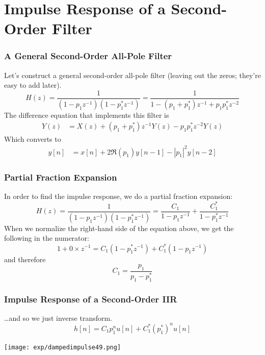 \documentclass{beamer}
\begin{document}
\section[Second-Order]{Impulse Response of a Second-Order Filter}
\setcounter{subsection}{1}

\begin{frame}
  \frametitle{A General Second-Order All-Pole Filter}

  Let's construct a general second-order all-pole filter (leaving out
  the zeros; they're easy to add later).
  \[
  H(z) = \frac{1}{(1-p_1z^{-1})(1-p_1^*z^{-1})}= \frac{1}{1-(p_1+p_1^*)z^{-1}+p_1p_1^*z^{-2}}
  \]
  The difference equation that implements this filter is
  \begin{align*}
    Y(z) &= X(z) + (p_1+p_1^*)z^{-1}Y(z) -p_1p_1^*z^{-2}Y(z)
  \end{align*}
  Which converts to
  \begin{align*}
    y[n] &= x[n] + 2\Re(p_1)y[n-1] - |p_1|^2 y[n-2]
  \end{align*}
\end{frame}

\begin{frame}
  \frametitle{Partial Fraction Expansion}

  In order to find the impulse response, we do a partial fraction expansion:
  \[
  H(z) = \frac{1}{(1-p_1z^{-1})(1-p_1^*z^{-1})}= \frac{C_1}{1-p_1z^{-1}} + \frac{C_1^*}{1-p_1^*z^{-1}}
  \]
  When we normalize the right-hand side of the equation above, we get the following
  in the numerator:
  \begin{displaymath}
    1 + 0\times z^{-1} = C_1(1-p_1^*z^{-1}) + C_1^*(1-p_1z^{-1})
  \end{displaymath}
  and therefore
  \begin{displaymath}
    C_1 = \frac{p_1}{p_1-p_1^*}
  \end{displaymath}
\end{frame}

\begin{frame}
  \frametitle{Impulse Response of a Second-Order IIR}

  \ldots and so we just inverse transform.
  \[
  h[n] = C_1p_1^n u[n] + C_1^* (p_1^*)^n u[n]
  \]
  \centerline{\texttt{[image: exp/dampedimpulse49.png]}}
\end{frame}
\end{document}
